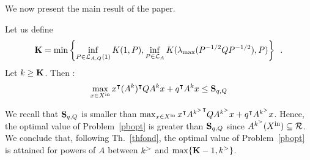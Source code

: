 \documentclass[10pt]{llncs}
\begin{document}
We now present the main result of the paper.
\begin{theorem}
\label{thfond}
Let us define \[\mathbf{K}=\min\left\{\inf_{P\in\mathcal{L}_{A,Q}(1)} K(1,P),\inf_{P\in\mathcal{L}_{A}} K(\lambda_{\operatorname{max}}(P^{-1/2}QP^{-1/2}),P)\right\}\enspace .\] Let $k\geq \mathbf{K}$. Then : 
\[
\max_{x\in X^\mathrm{in}} x^\intercal (A^k)^\intercal Q A^k x+q^\intercal A^k x\leq \mathbf{S}_{q,Q}
\]
\end{theorem}

%
%
We recall that $\mathbf{S}_{q,Q}$ is smaller than $\max_{x\in X^\mathrm{in}} x^\intercal {A^{k^{>}}}^\intercal Q A^{k^{>}} x+q^\intercal A^{k^{>}} x$. Hence, the optimal value of Problem~\ref{pbopt} is greater than $\mathbf{S}_{q,Q}$ since $A^{k^{>}} (X^\mathrm{in})\subseteq \mathcal{R}$. We conclude that, following Th.~\ref{thfond}, the optimal value of Problem~\ref{pbopt} is attained for powers of $A$ between $k^{>}$  and $\max\{\mathbf{K}-1,k^{>}\}$.
\end{document}
